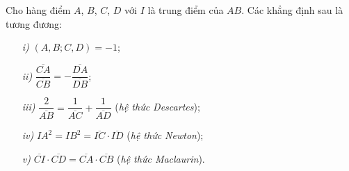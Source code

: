         \begin{theorem}
            Cho hàng điểm \(A\), \(B\), \(C\), \(D\) với \(I\) là trung điểm của \(AB\). Các khẳng định sau là tương đương:
            \vspace{-0.25cm}
            \begin{multicols}{2}
                \begin{enumerate}
                    \itemsep 0.25cm
                    \item[\textit{i)}] \((A,B;C,D) = -1\);
                    \item[\textit{ii)}] \(\dfrac{\overline{CA}}{\overline{CB}} = -\dfrac{\overline{DA}}{\overline{DB}}\);
                    \item[\textit{iii)}] \(\dfrac{2}{\overline{AB}} = \dfrac{1}{\overline{AC}} + \dfrac{1}{\overline{AD}}\) (\textit{hệ thức Descartes});
                \end{enumerate}
        
                \columnbreak
                
                \begin{enumerate}
                    \itemsep 0.25cm
                    \item[\textit{iv)}] \(IA^2 = IB^2 = \overline{IC} \cdot \overline{ID}\) (\textit{hệ thức Newton});
                    \item[\textit{v)}] \(\overline{CI} \cdot \overline{CD} = \overline{CA} \cdot \overline{CB}\) (\textit{hệ thức Maclaurin}).
                \end{enumerate}
            \end{multicols}
        \end{theorem}

